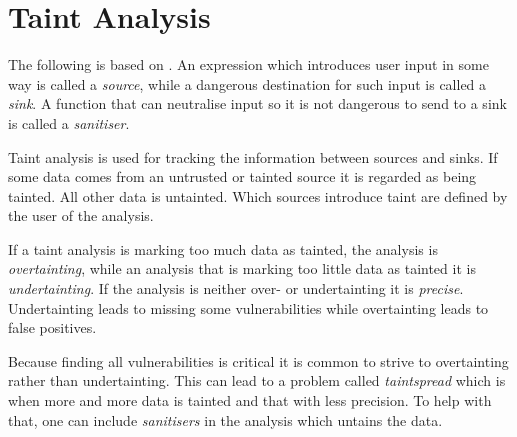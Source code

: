 \section{Taint Analysis}\label{theory:taint}
The following is based on \citet[Part 3]{schwartz2010all}.
An expression which introduces user input in some way is called a \emph{source}, while a dangerous destination for such input is called a \emph{sink}.
A function that can neutralise input so it is not dangerous to send to a sink is called a \emph{sanitiser}.

Taint analysis is used for tracking the information between sources and sinks.
If some data comes from an untrusted or tainted source it is regarded as being tainted.
All other data is untainted.
Which sources introduce taint are defined by the user of the analysis.

If a taint analysis is marking too much data as tainted, the analysis is \textit{overtainting}, while an analysis that is marking too little data as tainted it is \textit{undertainting}.
If the analysis is neither over- or undertainting it is \textit{precise}. 
Undertainting leads to missing some vulnerabilities while overtainting leads to false positives.

Because finding all vulnerabilities is critical it is common to strive to overtainting rather than undertainting.
This can lead to a problem called \textit{taintspread} which is when more and more data is tainted and that with less precision.
To help with that, one can include \textit{sanitisers} in the analysis which untains the data.
